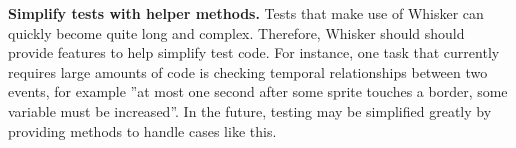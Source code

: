 \textbf{Simplify tests with helper methods.}
Tests that make use of Whisker can quickly become quite long and complex.
Therefore, Whisker should should provide features to help simplify test code.
For instance, one task that currently requires large amounts of code
is checking temporal relationships between two events,
for example ''at most one second after some sprite touches a border, some variable must be increased''.
In the future, testing may be simplified greatly by providing methods to handle cases like this.
\parspace


